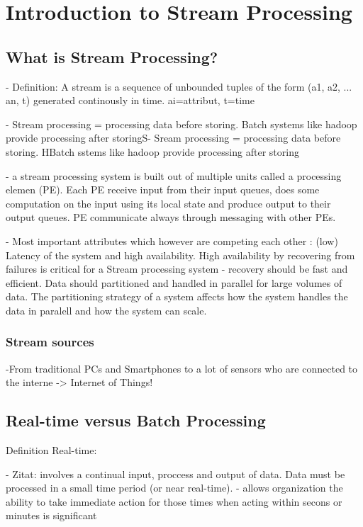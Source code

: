 \chapter{Introduction to Stream Processing}

\section{What is Stream Processing?}
- Definition: A stream is a sequence of unbounded tuples of the form (a1, a2,
... an, t) generated continously in time. ai=attribut, t=time

- Stream processing = processing data before storing. Batch systems like hadoop
provide processing after storingS- Sream processing = processing data before
storing. HBatch sstems like hadoop provide processing after storing  

- a stream processing system is built out of multiple units called a processing
elemen (PE). Each PE receive input from their input queues, does some
computation on the input using its local state and produce output to their
output queues. PE communicate always through messaging with other PEs.

- Most important attributes which however are competing each other : (low)
Latency of the system and high availability. High availability by recovering
from failures is critical for a Stream processing system - recovery should be
fast and efficient. Data should partitioned and handled in parallel for large
volumes of data. The partitioning strategy of a system  affects how the system
handles the data in paralell and how the system can scale. 

\subsection{Stream sources}
-From traditional PCs and Smartphones to a lot of sensors who are connected to
the interne -> Internet of Things!

\section{Real-time versus Batch Processing}
Definition Real-time:

- Zitat: involves a continual input, proccess and output of data. Data must be
processed in a small time period (or near real-time). 
- allows organization the ability to take immediate action for those times when
acting within secons or minutes is significant\\

